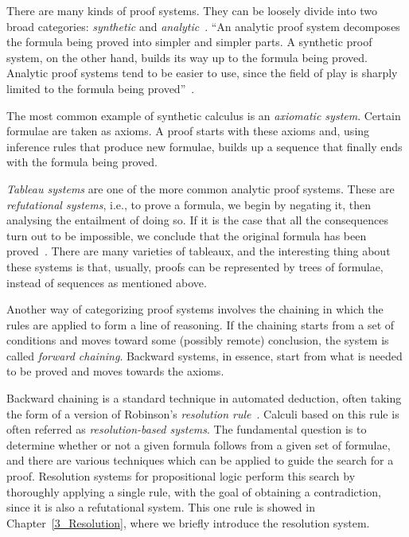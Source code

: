 There are many kinds of proof systems. They can be loosely divide into two broad
categories: \emph{synthetic} and \emph{analytic}~\cite{fitting}. ``An analytic
proof system decomposes the formula being proved into simpler and simpler parts.
A synthetic proof system, on the other hand, builds its way up to the formula
being proved. Analytic proof systems tend to be easier to use, since the field
of play is sharply limited to the formula being proved''~\cite{fitting}. 

The most common example of synthetic calculus is an \emph{axiomatic system}.
Certain formulae are taken as axioms. A proof starts with these axioms and,
using inference rules that produce new formulae, builds up a sequence that
finally ends with the formula being proved.

\emph{Tableau systems} are one of the more common analytic proof systems. These
are \emph{refutational systems}, i.e., to prove a formula, we begin by negating
it, then analysing the entailment of doing so. If it is the case that all the
consequences turn out to be impossible, we conclude that the original formula
has been proved~\cite{fitting}. There are many varieties of tableaux, and the
interesting thing about these systems is that, usually, proofs can be
represented by trees of formulae, instead of sequences as mentioned above.

Another way of categorizing proof systems involves the chaining in which the
rules are applied to form a line of reasoning. If the chaining starts from a set
of conditions and moves toward some (possibly remote) conclusion, the system is
called \emph{forward chaining}.
Backward systems, in essence, start from
what is needed to be proved and moves towards the axioms.

Backward chaining is a standard technique in automated deduction, often taking
the form of a version of Robinson's \emph{resolution
rule}~\cite{harland2000forward}. Calculi based on this rule is often referred as
\emph{resolution-based systems}. The fundamental question is to determine
whether or not a given formula follows from a given set of formulae, and there
are various techniques which can be applied to guide the search for a proof.
Resolution systems for propositional logic perform this search by thoroughly
applying a single rule, with the goal of obtaining a contradiction, since it is
also a refutational system. This one rule is showed in
Chapter~\ref{3_Resolution}, where we briefly introduce the resolution system.

